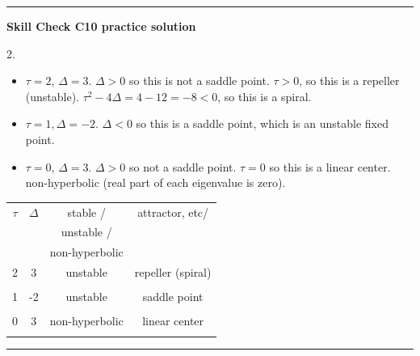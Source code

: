 \documentclass[12pt,letterpaper,noanswers]{exam}
\begin{document}
\hrule
\vspace{0.2cm}

\noindent\textbf{Skill Check C10 practice solution}

2. 
\begin{itemize}
    \item $\tau = 2$, $\Delta = 3$.  $\Delta > 0$ so this is not a saddle point.  $\tau > 0$, so this is a repeller (unstable).  $\tau^2 - 4\Delta = 4 - 12 = -8<0$, so this is a spiral.
    \item $\tau = 1, \Delta = -2$.  $\Delta < 0$ so this is a saddle point, which is an unstable fixed point.
    \item $\tau = 0$, $\Delta = 3$.  $\Delta > 0$ so not a saddle point.  $\tau = 0$ so this is a linear center.  non-hyperbolic (real part of each eigenvalue is zero).
\end{itemize}


\begin{tabular}{|c|c|c|c|}
\hline
$\tau$ & $\Delta$ & stable / & attractor, etc/ \\
& & unstable / &  \\
& & non-hyperbolic & \\
\hline
2 & 3 & unstable & repeller (spiral) \\
&  & & \\
\hline
 1    &  -2& unstable & saddle point\\
     & & & \\
     \hline
 0  & 3 & non-hyperbolic & linear center\\
     & & & \\
     \hline
\end{tabular}



\vspace{0.2cm}

\hrule
\vspace{0.2cm}
\end{document}
